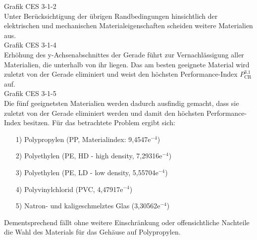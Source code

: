 Grafik CES 3-1-2\\
Unter Berücksichtigung der übrigen Randbedingungen hinsichtlich der elektrischen und mechanischen Materialeigenschaften scheiden weitere Materialien aus.\\
Grafik CES 3-1-4\\
Erhöhung des y-Achsenabschnittes der Gerade führt zur Vernachlässigung aller Materialien, die unterhalb von ihr liegen. Das am besten geeignete Material wird zuletzt von der Gerade eliminiert und weist den höchsten Performance-Index $P_{\text{CR}}^{3.1}$ auf.\\
Grafik CES 3-1-5\\
Die fünf geeignetsten Materialien werden dadurch ausfindig gemacht, dass sie zuletzt von der Gerade eliminiert werden und damit den höchsten Performance-Index besitzen. Für das betrachtete Problem ergibt sich:
\begin{itemize}
\item[1)] Polypropylen (PP, Materialindex: 9,4547e$^{-4}$)
\item[2)] Polyethylen (PE, HD - high density, 7,29316e$^{-4}$)
\item[3)] Polyethylen (PE, LD - low density, 5,55704e$^{-4}$)
\item[4)] Polyvinylchlorid (PVC, 4,47917e$^{-4}$)
\item[5)] Natron- und kaligeschmelztes Glas (3,30562e$^{-4}$)
\end{itemize}
Dementsprechend fällt ohne weitere Einschränkung oder offensichtliche Nachteile die Wahl des Materials für das Gehäuse auf Polypropylen.

